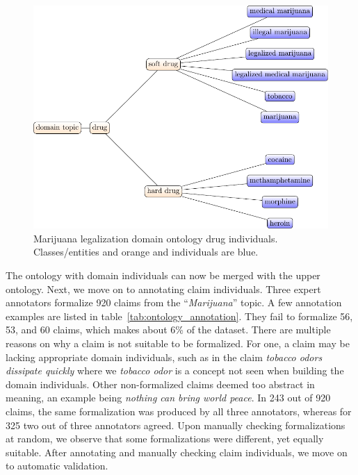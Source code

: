 \begin{figure}
\includegraphics{formalizations_drug_hierarchy-figure0.pdf}
\caption{Marijuana legalization domain ontology drug individuals. 
	Classes/entities and orange and individuals are blue. }
	\label{fig:drug_domain_individuals}
\end{figure}


The ontology with domain individuals can now be merged with the upper ontology. 
Next, we move on to annotating claim individuals. Three expert annotators
formalize 920 claims from the ``\emph{Marijuana}'' topic. A few annotation
examples are listed in table~\ref{tab:ontology_annotation}.
They fail to formalize 56, 53, and 60 claims, which makes about 6\% of the dataset. 
There are multiple reasons on why a claim is not suitable to be formalized. 
For one, a claim may be lacking appropriate domain individuals, such as in the claim
\emph{tobacco odors dissipate quickly} where we \emph{tobacco odor} is a concept
not seen when building the domain individuals. Other non-formalized claims
deemed too abstract in meaning, an example being \emph{nothing can bring 
world peace}. In 243 out of 920 claims, the same formalization was produced 
by all three annotators, whereas for 325 two out of three annotators agreed. 
Upon manually checking formalizations at random, we observe that some
formalizations were different, yet equally suitable. After annotating and manually
checking claim individuals, we move on to  automatic validation. 

